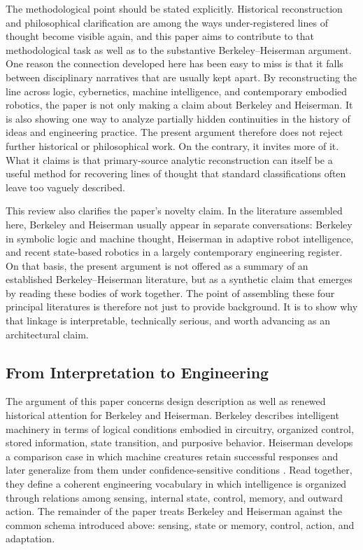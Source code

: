 \documentclass[11pt]{article}
\begin{document}
The methodological point should be stated explicitly. Historical reconstruction and philosophical clarification are among the ways under-registered lines of thought become visible again, and this paper aims to contribute to that methodological task as well as to the substantive Berkeley--Heiserman argument. One reason the connection developed here has been easy to miss is that it falls between disciplinary narratives that are usually kept apart. By reconstructing the line across logic, cybernetics, machine intelligence, and contemporary embodied robotics, the paper is not only making a claim about Berkeley and Heiserman. It is also showing one way to analyze partially hidden continuities in the history of ideas and engineering practice. The present argument therefore does not reject further historical or philosophical work. On the contrary, it invites more of it. What it claims is that primary-source analytic reconstruction can itself be a useful method for recovering lines of thought that standard classifications often leave too vaguely described.

This review also clarifies the paper's novelty claim. In the literature assembled here, Berkeley and Heiserman usually appear in separate conversations: Berkeley in symbolic logic and machine thought, Heiserman in adaptive robot intelligence, and recent state-based robotics in a largely contemporary engineering register. On that basis, the present argument is not offered as a summary of an established Berkeley--Heiserman literature, but as a synthetic claim that emerges by reading these bodies of work together. The point of assembling these four principal literatures is therefore not just to provide background. It is to show why that linkage is interpretable, technically serious, and worth advancing as an architectural claim.

\subsection*{From Interpretation to Engineering}

The argument of this paper concerns design description as well as renewed historical attention for Berkeley and Heiserman. Berkeley describes intelligent machinery in terms of logical conditions embodied in circuitry, organized control, stored information, state transition, and purposive behavior. Heiserman develops a comparison case in which machine creatures retain successful responses and later generalize from them under confidence-sensitive conditions \citep[pp.~18--20]{heiserman1981robot}. Read together, they define a coherent engineering vocabulary in which intelligence is organized through relations among sensing, internal state, control, memory, and outward action. The remainder of the paper treats Berkeley and Heiserman against the common schema introduced above: sensing, state or memory, control, action, and adaptation.
\end{document}
